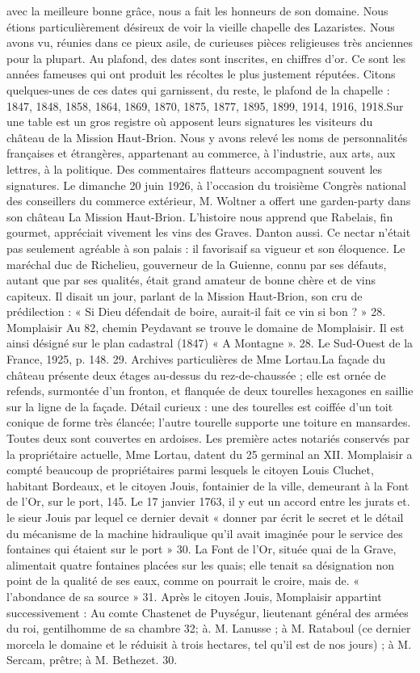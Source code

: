 avec la meilleure bonne grâce, nous a fait les honneurs de son domaine. Nous étions particulièrement désireux de voir la vieille chapelle des Lazaristes. Nous avons vu, réunies dans ce pieux asile, de curieuses pièces religieuses très anciennes pour la plupart. Au plafond, des dates sont inscrites, en chiffres d'or. Ce sont les années fameuses qui ont produit les récoltes le plus justement réputées. Citons quelques-unes de ces dates qui garnissent, du reste, le plafond de la chapelle : 1847, 1848, 1858, 1864, 1869, 1870, 1875, 1877, 1895, 1899, 1914, 1916, 1918.Sur une table est un gros registre où apposent leurs signatures les visiteurs du château de la Mission Haut-Brion. Nous y avons relevé les noms de personnalités françaises et étrangères, appartenant au commerce, à l'industrie, aux arts, aux lettres, à la politique. Des commentaires flatteurs accompagnent souvent les signatures. Le dimanche 20 juin 1926, à l'occasion du troisième Congrès national des conseillers du commerce extérieur, M. Woltner a offert une garden-party dans son château La Mission Haut-Brion. L'histoire nous apprend que Rabelais, fin gourmet, appréciait vivement les vins des Graves. Danton aussi. Ce nectar n'était pas seulement agréable à son palais : il favorisaif sa vigueur et son éloquence. Le maréchal duc de Richelieu, gouverneur de la Guienne, connu par ses défauts, autant que par ses qualités, était grand amateur de bonne chère et de vins capiteux. Il disait un jour, parlant de la Mission Haut-Brion, son cru de prédilection : « Si Dieu défendait de boire, aurait-il fait ce vin si bon ? » 28. Momplaisir Au 82, chemin Peydavant se trouve le domaine de Momplaisir. Il est ainsi désigné sur le plan cadastral (1847) « A Montagne ». 28. Le Sud-Ouest de la France, 1925, p. 148. 29. Archives particulières de Mme Lortau.La façade du château présente deux étages au-dessus du rez-de-chaussée ; elle est ornée de refends, surmontée d'un fronton, et flanquée de deux tourelles hexagones en saillie sur la ligne de la façade. Détail curieux : une des tourelles est coiffée d'un toit conique de forme très élancée; l'autre tourelle supporte une toiture en mansardes. Toutes deux sont couvertes en ardoises. Les première actes notariés conservés par la propriétaire actuelle, Mme Lortau, datent du 25 germinal an XII. Momplaisir a compté beaucoup de propriétaires parmi lesquels le citoyen Louis Cluchet, habitant Bordeaux, et le citoyen Jouis, fontainier de la ville, demeurant à la Font de l'Or, sur le port, 145. Le 17 janvier 1763, il y eut un accord entre les jurats et. le sieur Jouis par lequel ce dernier devait « donner par écrit le secret et le détail du mécanisme de la machine hidraulique qu'il avait imaginée pour le service des fontaines qui étaient sur le port » 30. La Font de l'Or, située quai de la Grave, alimentait quatre fontaines placées sur les quais; elle tenait sa désignation non point de la qualité de ses eaux, comme on pourrait le croire, mais de. « l'abondance de sa source » 31. Après le citoyen Jouis, Momplaisir appartint successivement : Au comte Chastenet de Puységur, lieutenant général des armées du roi, gentilhomme de sa chambre 32; à. M. Lanusse ; à M. Rataboul (ce dernier morcela le domaine et le réduisit à trois hectares, tel qu'il est de nos jours) ; à M. Sercam, prêtre; à M. Bethezet. 30. 